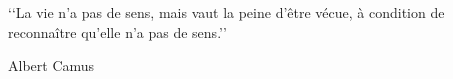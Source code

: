 
\chapter*{}

\vspace{6cm}

\begin{center}
    \lq\lq La vie n'a pas de sens, mais vaut la peine d'être vécue, à condition de reconnaître qu'elle n'a pas de sens.\rq\rq \\	
\end{center}
\begin{flushright}
    Albert Camus  
\end{flushright}